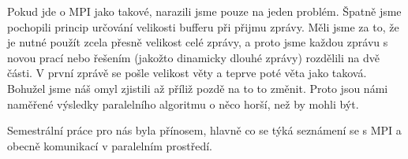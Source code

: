 \documentclass[12pt]{article}
\begin{document}
Pokud jde o MPI jako takové, narazili jsme pouze na jeden problém. Špatně jsme
pochopili princip určování velikosti bufferu při přijmu zprávy. Měli jsme za to,
že je nutné použít zcela přesně velikost celé zprávy, a proto jsme každou zprávu
s novou prací nebo řešením (jakožto dinamicky dlouhé zprávy) rozdělili na dvě
části. V první zprávě se pošle velikost věty a teprve poté věta jako taková.
Bohužel jsme náš omyl zjistili až příliž pozdě na to to změnit. Proto jsou námi
naměřené výsledky paralelního algoritmu o něco horší, než by mohli být.

Semestrální práce pro nás byla přínosem, hlavně co se týká seznámení se s MPI a
obecně komunikací v paralelním prostředí. 
\end{document}

